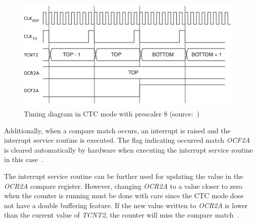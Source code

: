 \begin{figure}
  \centering
  \includegraphics[width=12cm,keepaspectratio]{fig/timing-diagram.pdf}
  \caption{Timing diagram in CTC mode with prescaler 8 (source:~\cite{avr-datasheet})}
  \label{fig:design-timing-diagram}
\end{figure}

Additionally, when a compare match occurs,
an interrupt is raised and the interrupt service routine is executed.
The flag indicating occurred match {\it{OCF2A}} is
cleared automatically by hardware when executing
the interrupt service routine in this case~\cite{avr-datasheet}.

The interrupt service routine can be further used for updating the value in the {\it{OCR2A}} compare register.
However, changing {\it{OCR2A}} to a value closer to zero when the counter is running
must be done with care since the CTC mode does not have a double buffering feature.
If the new value written to {\it{OCR2A}} is lower than the current
value of {\it{TCNT2}}, the counter will miss the compare match~\cite{avr-datasheet}.
